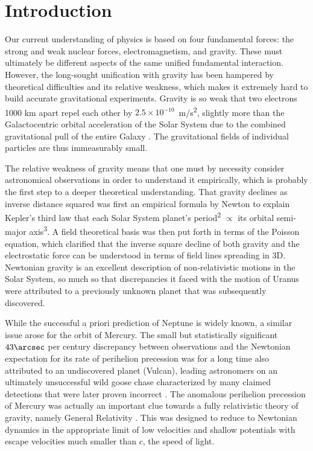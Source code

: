 \documentclass[fleqn,usenatbib,useAMS]{mnras} %
\begin{document}
\section{Introduction}
\label{Introduction}

Our current understanding of physics is based on four fundamental forces: the strong and weak nuclear forces, electromagnetism, and gravity. These must ultimately be different aspects of the same unified fundamental interaction. However, the long-sought unification with gravity has been hampered by theoretical difficulties and its relative weakness, which makes it extremely hard to build accurate gravitational experiments. Gravity is so weak that two electrons 1000 km apart repel each other by $2.5 \times 10^{-10}$~m/s\textsuperscript{2}, slightly more than the Galactocentric orbital acceleration of the Solar System due to the combined gravitational pull of the entire Galaxy \citep{Klioner_2021}. The gravitational fields of individual particles are thus immeasurably small.

The relative weakness of gravity means that one must by necessity consider astronomical observations in order to understand it empirically, which is probably the first step to a deeper theoretical understanding. That gravity declines as inverse distance squared was first an empirical formula by Newton to explain Kepler's third law that each Solar System planet's period\textsuperscript{2} $\propto$ its orbital semi-major axis\textsuperscript{3}. A field theoretical basis was then put forth in terms of the Poisson equation, which clarified that the inverse square decline of both gravity and the electrostatic force can be understood in terms of field lines spreading in 3D. Newtonian gravity is an excellent description of non-relativistic motions in the Solar System, so much so that discrepancies it faced with the motion of Uranus were attributed to a previously unknown planet that was subsequently discovered.

While the successful a priori prediction of Neptune is widely known, a similar issue arose for the orbit of Mercury. The small but statistically significant $43\arcsec$ per century discrepancy between observations and the Newtonian expectation for its rate of perihelion precession was for a long time also attributed to an undiscovered planet (Vulcan), leading astronomers on an ultimately unsuccessful wild goose chase characterized by many claimed detections that were later proven incorrect \citep{Levenson_2015}. The anomalous perihelion precession of Mercury was actually an important clue towards a fully relativistic theory of gravity, namely General Relativity \citep[GR;][]{Einstein_1915}. This was designed to reduce to Newtonian dynamics in the appropriate limit of low velocities and shallow potentials with escape velocities much smaller than $c$, the speed of light.
\end{document}
